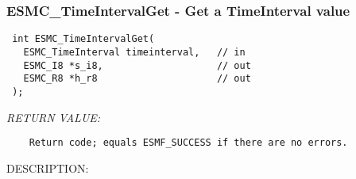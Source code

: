  
\setlength{\oldparskip}{\parskip}
\setlength{\parskip}{1.5ex}
\setlength{\oldparindent}{\parindent}
\setlength{\parindent}{0pt}
\setlength{\oldbaselineskip}{\baselineskip}
\setlength{\baselineskip}{11pt}
 
\def\bv{\begin{verbatim}}
\def\ev{\end{verbatim}}
\def\be{\begin{equation}}
\def\ee{\end{equation}}
\def\bea{\begin{eqnarray}}
\def\eea{\end{eqnarray}}
\def\bi{\begin{itemize}}
\def\ei{\end{itemize}}
\def\bn{\begin{enumerate}}
\def\en{\end{enumerate}}
\def\bd{\begin{description}}
\def\ed{\end{description}}
\def\({\left (}
\def\){\right )}
\def\[{\left [}
\def\]{\right ]}
\def\<{\left  \langle}
\def\>{\right \rangle}
\def\cI{{\cal I}}
\def\diag{\mathop{\rm diag}}
\def\tr{\mathop{\rm tr}}


 
\subsubsection [ESMC\_TimeIntervalGet] {ESMC\_TimeIntervalGet - Get a TimeInterval value}


  
\begin{verbatim} int ESMC_TimeIntervalGet(
   ESMC_TimeInterval timeinterval,   // in
   ESMC_I8 *s_i8,                    // out
   ESMC_R8 *h_r8                     // out
 );
 \end{verbatim}{\em RETURN VALUE:}
\begin{verbatim}    Return code; equals ESMF_SUCCESS if there are no errors.\end{verbatim}
{\sf DESCRIPTION:\\ }


